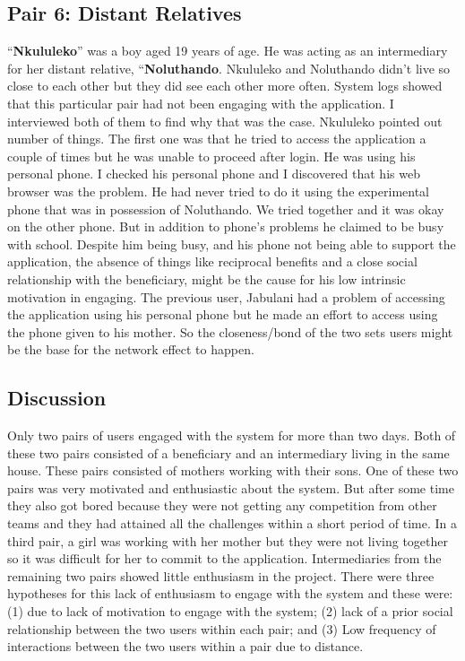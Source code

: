 \subsection*{\textbf{Pair 6: Distant Relatives}}
``\textbf{Nkululeko}'' was a boy aged 19 years of age. He was acting as an intermediary for her distant relative, ``\textbf{Noluthando}. Nkululeko and Noluthando didn't live so close to each other but they did see each other more often. System logs showed that this particular pair had not been engaging with the application. I interviewed both of them to find why that was the case. Nkululeko pointed out number of things. The first one was that he tried to access the application a couple of times but he was unable to proceed after login. He was using his personal phone. I checked his personal phone and I discovered that his web browser was the problem. He had never tried to do it using the experimental phone that was in possession of Noluthando. We tried together and it was okay on the other phone.  But in addition to phone's problems he claimed to be busy with school. Despite him being busy, and his phone not being able to support the application,  the absence of things like reciprocal benefits  and a close social relationship with the beneficiary, might be the cause for his low intrinsic motivation in engaging. The previous user, Jabulani had a problem of accessing the application using his personal phone but he made an effort to access using the phone  given to his mother. So the closeness/bond of the two sets users might be the base for the network effect to happen.
\subsection{Discussion}
Only two pairs of users engaged with the system for more than two days. Both of these two pairs consisted of a beneficiary and an  intermediary living in the same house. These pairs consisted of mothers working with their sons. One of these two pairs was very motivated and enthusiastic about the system. But after some time they also got bored because they were not getting any competition from other teams and they had attained all the challenges within a short period of time. In a third pair, a girl was working with her mother but they were not living together so it was difficult for her to commit to the application. Intermediaries from the remaining two pairs showed little enthusiasm in the project. There were three hypotheses for this lack of enthusiasm to engage with the system and these were: (1) due to lack of motivation to engage with the system; (2) lack of a prior social relationship between the two users within each pair; and (3) Low frequency of interactions between the two users within a pair due to distance.

